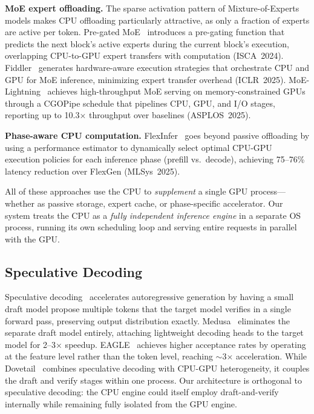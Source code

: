 \documentclass[10pt,conference]{IEEEtran}
\begin{document}
\textbf{MoE expert offloading.}
The sparse activation pattern of Mixture-of-Experts models makes CPU offloading particularly attractive, as only a fraction of experts are active per token.
Pre-gated MoE~\cite{hwang2024pregated} introduces a pre-gating function that predicts the next block's active experts during the current block's execution, overlapping CPU-to-GPU expert transfers with computation (ISCA~2024).
Fiddler~\cite{kamahori2025fiddler} generates hardware-aware execution strategies that orchestrate CPU and GPU for MoE inference, minimizing expert transfer overhead (ICLR~2025).
MoE-Lightning~\cite{cao2025moelightning} achieves high-throughput MoE serving on memory-constrained GPUs through a CGOPipe schedule that pipelines CPU, GPU, and I/O stages, reporting up to 10.3$\times$ throughput over baselines (ASPLOS~2025).

\textbf{Phase-aware CPU computation.}
FlexInfer~\cite{na2025flexinfer} goes beyond passive offloading by using a performance estimator to dynamically select optimal CPU-GPU execution policies for each inference phase (prefill vs.\ decode), achieving 75--76\% latency reduction over FlexGen (MLSys~2025).

All of these approaches use the CPU to \emph{supplement} a single GPU process---whether as passive storage, expert cache, or phase-specific accelerator.
Our system treats the CPU as a \emph{fully independent inference engine} in a separate OS process, running its own scheduling loop and serving entire requests in parallel with the GPU.

\subsection{Speculative Decoding}
Speculative decoding~\cite{leviathan2023speculative, chen2023speculative} accelerates autoregressive generation by having a small draft model propose multiple tokens that the target model verifies in a single forward pass, preserving output distribution exactly.
Medusa~\cite{cai2024medusa} eliminates the separate draft model entirely, attaching lightweight decoding heads to the target model for 2--3$\times$ speedup.
EAGLE~\cite{li2024eagle} achieves higher acceptance rates by operating at the feature level rather than the token level, reaching $\sim$3$\times$ acceleration.
While Dovetail~\cite{dovetail2024} combines speculative decoding with CPU-GPU heterogeneity, it couples the draft and verify stages within one process.
Our architecture is orthogonal to speculative decoding: the CPU engine could itself employ draft-and-verify internally while remaining fully isolated from the GPU engine.
\end{document}
